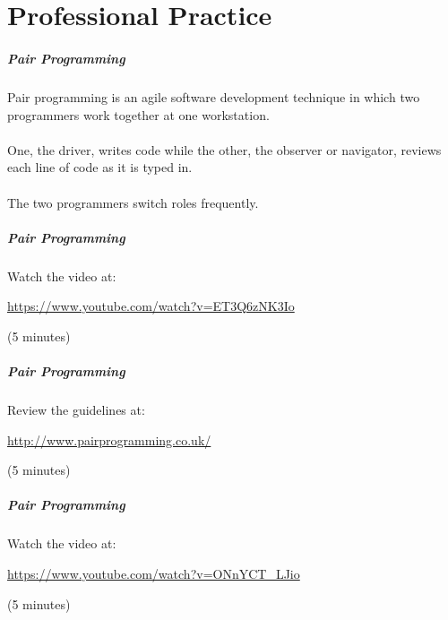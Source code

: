 \part{Professional Practice}
\frame{\partpage}

\begin{frame}
	\frametitle{Pair Programming}
		
	Pair programming is an agile software development technique in which two programmers work together 
	at one workstation. 
	\\~\\
	One, the driver, writes code while the other, the observer or navigator, reviews 
	each line of code as it is typed in. 
	\\~\\
	The two programmers switch roles frequently.
	
\end{frame}

\begin{frame}
	\frametitle{Pair Programming}
	
	Watch the video at:
	
	\vspace{1.5em}
		
	\url{https://www.youtube.com/watch?v=ET3Q6zNK3Io}
	
	\vspace{1em}
		
	(5 minutes)
	
\end{frame}

\begin{frame}
	\frametitle{Pair Programming}
	
	Review the guidelines at:
	
	\vspace{1.5em}
		
	\url{http://www.pairprogramming.co.uk/}
	
	\vspace{1em}
		
	(5 minutes)
	
\end{frame}

\begin{frame}
	\frametitle{Pair Programming}
	
	Watch the video at:
	
	\vspace{1.5em}
		
	\url{https://www.youtube.com/watch?v=ONnYCT_LJio}
	
	\vspace{1em}
		
	(5 minutes)
	
\end{frame}